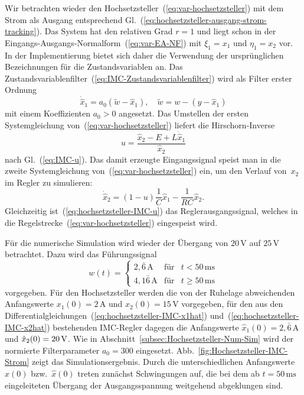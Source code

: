 \begin{example}
\label{exa:hochsetzsteller-IMC}Wir betrachten wieder den Hochsetzsteller~(\ref{eq:var-hochsetzsteller})
mit dem Strom als Ausgang entsprechend Gl.~(\ref{eq:hochsetzsteller-ausgang-strom-tracking}).
Das System hat den relativen Grad $r=1$ und liegt schon in der Eingangs-Ausgangs-Normalform~(\ref{eq:var-EA-NF})
mit $\xi_{1}=x_{1}$ und $\eta_{1}=x_{2}$ vor. In der Implementierung
bietet sich daher die Verwendung der ursprünglichen Bezeichnungen
für die Zustandsvariablen an. Das Zustandsvariablenfilter~(\ref{eq:IMC-Zustandsvariablenfilter})
wird als Filter erster Ordnung
\begin{equation}
\dot{\hat{x}}_{1}=a_{0}\left(\tilde{w}-\hat{x}_{1}\right),\quad\tilde{w}=w-\left(y-\hat{x}_{1}\right)\label{eq:hochsetzsteller-IMC-x1hat}
\end{equation}
mit einem Koeffizienten $a_{0}>0$ angesetzt. Das Umstellen der ersten
Systemgleichung von~(\ref{eq:var-hochsetzsteller}) liefert die Hirschorn-Inverse
\begin{equation}
u=\frac{\hat{x}_{2}-E+L\dot{\hat{x}}_{1}}{\hat{x}_{2}}\label{eq:hochsetzsteller-IMC-u}
\end{equation}
nach Gl.~(\ref{eq:IMC-u}). Das damit erzeugte Eingangssignal speist
man in die zweite Systemgleichung von~(\ref{eq:var-hochsetzsteller})
ein, um den Verlauf von~$x_{2}$ im Regler zu simulieren: 
\begin{equation}
\dot{\hat{x}}_{2}=(1-u)\frac{1}{C}\hat{x}_{1}-\frac{1}{RC}\hat{x}_{2}.\label{eq:hochsetzsteller-IMC-x2hat}
\end{equation}
Gleichzeitig ist~(\ref{eq:hochsetzsteller-IMC-u}) das Reglerausgangssignal,
welches in die Regelstrecke~(\ref{eq:var-hochsetzsteller}) eingespeist
wird.

Für die numerische Simulation wird wieder der Übergang von $20\,\text{V}$
auf $25\,\text{V}$ betrachtet. Dazu wird das Führungssignal 
\[
w(t)=\left\{ \begin{array}{rcl}
2,\bar{6}\,\text{A} & \text{für} & t<50\,\text{ms}\\
4,1\bar{6}\,\text{A} & \text{für} & t\geq50\,\text{ms}
\end{array}\right.
\]
vorgegeben. Für den Hochsetzsteller werden die von der Ruhelage abweichenden
Anfangswerte $x_{1}(0)=2\,\text{A}$ und $x_{2}(0)=15\,\text{V}$
vorgegeben, für den aus den Differentialgleichungen~(\ref{eq:hochsetzsteller-IMC-x1hat})
und~(\ref{eq:hochsetzsteller-IMC-x2hat}) bestehenden IMC-Regler
dagegen die Anfangswerte $\hat{x}_{1}(0)=2,\bar{6}\,\text{A}$ und
$\hat{x}_{2}(0)=20\,\text{\text{V}}$. Wie in Abschnitt~\ref{subsec:Hochsetzsteller-Num-Sim}
wird der normierte Filterparameter $a_{0}=300$ eingesetzt. Abb.~\ref{fig:Hochsetzsteller-IMC-Strom}
zeigt das Simulationsergebnis. Durch die unterschiedlichen Anfangswerte~$x(0)$
bzw.~$\hat{x}(0)$ treten zunächst Schwingungen auf, die bei dem
ab $t=50\,\text{ms}$ eingeleiteten Übergang der Ausgangsspannung
weitgehend abgeklungen sind.
\end{example}
